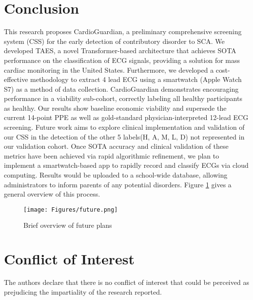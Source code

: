 \documentclass[
	a4paper, 
	10pt, 
	twoside, 
]{LTJournalArticle}
\begin{document}
\section{Conclusion}
    This research proposes CardioGuardian, a preliminary comprehensive screening system (CSS) for the early detection of contributory disorder to SCA. We developed TAES, a novel Transformer-based architecture that achieves SOTA performance on the classification of ECG signals, providing a solution for mass cardiac monitoring in the United States. Furthermore, we developed a cost-effective methodology to extract 4 lead ECG using a smartwatch (Apple Watch S7) as a method of data collection. CardioGuardian demonstrates encouraging performance in a viability sub-cohort, correctly labeling all healthy participants as healthy. Our results show baseline economic viability and supersede the current 14-point PPE as well as gold-standard physician-interpreted 12-lead ECG screening. Future work aims to explore clinical implementation and validation of our CSS in the detection of the other 5 labels(H, A, M, L, D) not represented in our validation cohort. Once SOTA accuracy and clinical validation of these metrics have been achieved via rapid algorithmic refinement, we plan to implement a smartwatch-based app to rapidly record and classify ECGs via cloud computing. Results would be uploaded to a school-wide database, allowing administrators to inform parents of any potential disorders. Figure \ref{fig:future} gives a general overview of this process. 
\begin{figure}[!h]
    \centering
    \texttt{[image: Figures/future.png]}
    \caption{Brief overview of future plans}
    \label{fig:future}
\end{figure}

\newpage
\section{Conflict of Interest}
The authors declare that there is no conflict of interest
that could be perceived as prejudicing the impartiality of
the research reported.
\end{document}
